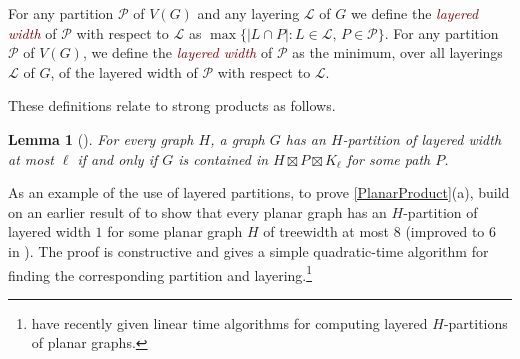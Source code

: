 \documentclass{patmorin}
\theoremstyle{plain}
\newtheorem{thm}{Theorem}
\newtheorem{lem}[thm]{Lemma}
\theoremstyle{definition}
\newcommand{\defin}[1]{\textcolor{Maroon}{\emph{#1}}}
\newcommand{\note}[2]{\noindent{\color{red}[#1:~#2]}}
\DeclareMathOperator{\tw}{tw}
\newcommand{\PP}{\mathcal{P}}
\renewcommand{\leq}{\leqslant}
\begin{document}
For any partition $\PP$ of $V(G)$ and any layering $\mathcal{L}$ of $G$ we define the \defin{layered width} of $\PP$ with respect to $\mathcal{L}$ as $\max\{|L\cap P|: L\in\mathcal{L},\, P\in\PP\}$.  For any partition $\PP$ of $V(G)$, we define the \defin{layered width} of $\PP$ as the minimum, over all layerings $\mathcal{L}$ of $G$, of the layered width of $\PP$ with respect to $\mathcal{L}$.


These definitions relate to strong products as follows.

\begin{lem}[\citep{DJMMUW20}]
\label{PartitionProduct}
For every graph $H$, a graph $G$ has an $H$-partition of layered width at most $\ell$ if and only if $G$ is contained in $H \boxtimes P \boxtimes K_\ell$ for some path $P$.
\end{lem}

As an example of the use of layered partitions, to prove \cref{PlanarProduct}(a),
\citet{DJMMUW20} build on an earlier result of \citet{PS21} to show that every planar graph has an $H$-partition of layered width $1$ for some planar graph $H$ of treewidth at most $8$ (improved to $6$ in \cite{UWY}). The proof is constructive and gives a simple quadratic-time algorithm for finding the corresponding partition and layering.\footnote{\citet{bose.morin.ea:optimal} have recently given linear time algorithms for computing layered $H$-partitions of planar graphs.} 


% 
% 
% 
\end{document}
